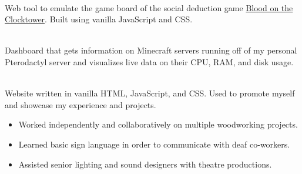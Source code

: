 \documentclass[10pt,a4paper,ragged2e,withhyper]{altacv}
\begin{document}

 \\\smallskip
Web tool to emulate the game board of the social deduction game \href{https://bloodontheclocktower.com/}{Blood on the Clocktower}. Built using vanilla JavaScript and CSS.

\divider

 \\\smallskip
Dashboard that gets information on Minecraft servers running off
of my personal Pterodactyl  server and visualizes live data on their
CPU, RAM, and disk usage.

\divider

 \\\smallskip
Website written in vanilla HTML, JavaScript, and CSS.
Used to promote myself and showcase my experience
and projects.


\smallskip
{}
\begin{paracol}{4}
\switchcolumn[1]
\switchcolumn[2]
\switchcolumn[3]
\end{paracol}


\smallskip
{}

\begin{itemize}
\item Worked independently and collaboratively on multiple woodworking projects.
\item Learned basic sign language in order to communicate with deaf co-workers.
\item Assisted senior lighting and sound designers with theatre productions.
\end{itemize}
\end{document}
